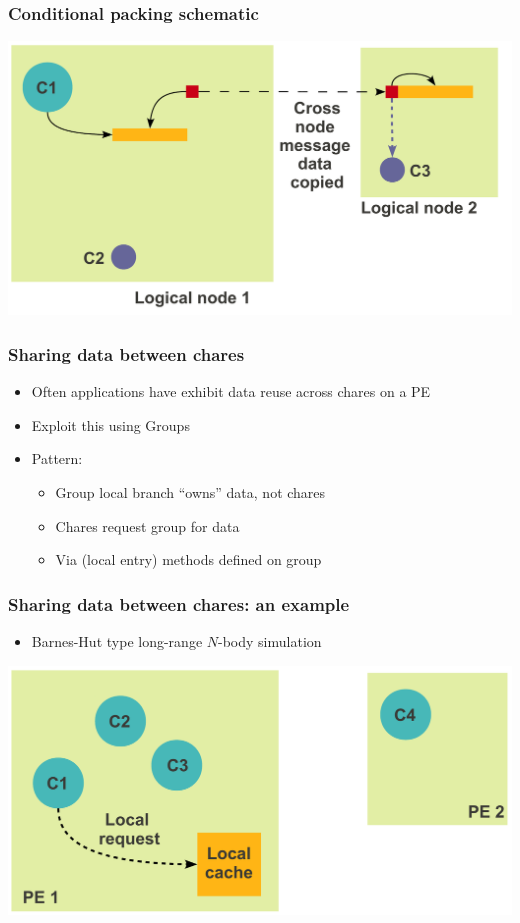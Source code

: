 \begin{frame}[fragile]
  \frametitle{Conditional packing schematic}
  \includegraphics[width=\textwidth]{figures/advancedOpts/fig3}
\end{frame}

\begin{frame}[fragile]
  \frametitle{Sharing data between chares}
  \begin{itemize}
  \item Often applications have exhibit data reuse across chares on a PE
  \item Exploit this using Groups
  \item Pattern:
    \begin{itemize}
    \item Group local branch “owns” data, not chares
    \item Chares request group for data
    \item Via (local entry) methods defined on group
    \end{itemize}
  \end{itemize}
\end{frame}

\begin{frame}[fragile]
  \frametitle{Sharing data between chares: an example}
  \begin{itemize}
    \item Barnes-Hut type long-range $N$-body simulation
  \end{itemize}
  \includegraphics[width=\textwidth]{figures/advancedOpts/fig4}
\end{frame}

